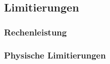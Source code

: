 \subsection{Limitierungen}
\label{subsec:limitierungen}

\subsubsection{Rechenleistung}
\subsubsection{Physische Limitierungen}